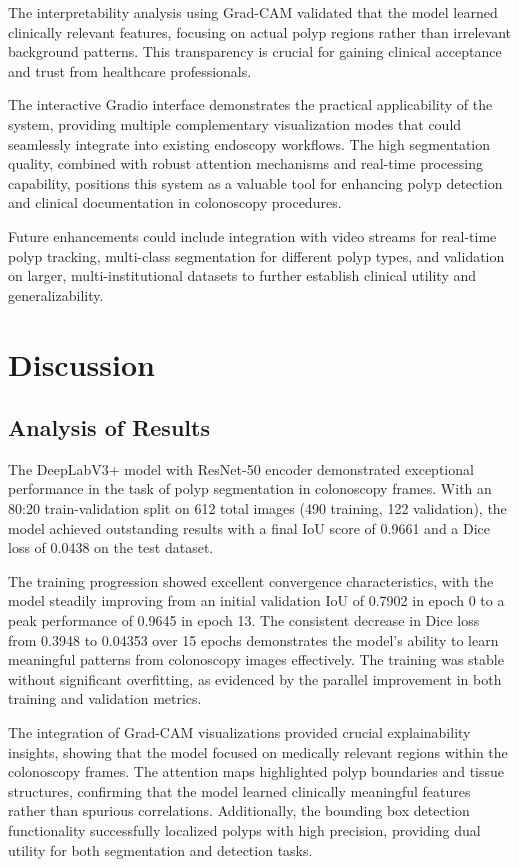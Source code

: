 \documentclass[a4paper,12pt]{report}
\begin{document}
The interpretability analysis using Grad-CAM validated that the model learned clinically relevant features, focusing on actual polyp regions rather than irrelevant background patterns. This transparency is crucial for gaining clinical acceptance and trust from healthcare professionals.

The interactive Gradio interface demonstrates the practical applicability of the system, providing multiple complementary visualization modes that could seamlessly integrate into existing endoscopy workflows. The high segmentation quality, combined with robust attention mechanisms and real-time processing capability, positions this system as a valuable tool for enhancing polyp detection and clinical documentation in colonoscopy procedures.

Future enhancements could include integration with video streams for real-time polyp tracking, multi-class segmentation for different polyp types, and validation on larger, multi-institutional datasets to further establish clinical utility and generalizability.

\chapter{Discussion}

\section{Analysis of Results}

The DeepLabV3+ model with ResNet-50 encoder demonstrated exceptional performance in the task of polyp segmentation in colonoscopy frames. With an 80:20 train-validation split on 612 total images (490 training, 122 validation), the model achieved outstanding results with a final IoU score of 0.9661 and a Dice loss of 0.0438 on the test dataset.

The training progression showed excellent convergence characteristics, with the model steadily improving from an initial validation IoU of 0.7902 in epoch 0 to a peak performance of 0.9645 in epoch 13. The consistent decrease in Dice loss from 0.3948 to 0.04353 over 15 epochs demonstrates the model's ability to learn meaningful patterns from colonoscopy images effectively. The training was stable without significant overfitting, as evidenced by the parallel improvement in both training and validation metrics.

The integration of Grad-CAM visualizations provided crucial explainability insights, showing that the model focused on medically relevant regions within the colonoscopy frames. The attention maps highlighted polyp boundaries and tissue structures, confirming that the model learned clinically meaningful features rather than spurious correlations. Additionally, the bounding box detection functionality successfully localized polyps with high precision, providing dual utility for both segmentation and detection tasks.
\end{document}
